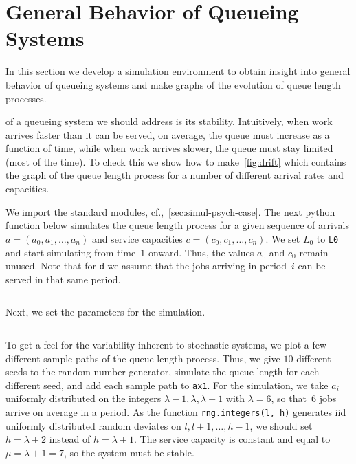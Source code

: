 \documentclass[stochastic-or.tex]{subfiles}
\begin{document}
\section{General Behavior of Queueing Systems}
\label{sec:simul-discr-time}


In this section we develop a simulation environment to obtain insight into general behavior of queueing systems and make graphs of the evolution of queue length processes.


 of a queueing system we should address is its stability.
Intuitively, when work arrives faster than it can be served, on average, the queue must increase as a function of time, while when work arrives slower, the queue must stay limited (most of the time).
To check this we show how to make~\cref{fig:drift} which contains the graph of the queue length process for a number of different arrival rates and capacities.




We import the standard modules, cf.,~\cref{sec:simul-psych-case}.
The next python function below simulates the queue length process for a given sequence of arrivals $a=(a_{0}, a_{1}, \ldots, a_{n})$ and service capacities $c = (c_{0}, c_{1}, \ldots, c_{n})$.
We set $L_{0}$ to \texttt{L0} and start simulating from time~$1$ onward.
Thus, the values $a_{0}$ and $c_{0}$ remain unused.
Note that for \texttt{d} we assume that the jobs arriving in period~$i$ can be served in that same period.
\inputminted[firstline=26, lastline=34]{python}{../code/discrete_simulations.py} %

Next, we set the parameters for the simulation.
\inputminted[firstline=40, lastline=43]{python}{../code/discrete_simulations.py} %

To get a feel for the variability inherent to stochastic systems, we plot a few different sample paths of the queue length process.
Thus, we give $10$ different seeds to the random number generator, simulate the queue length for each different seed, and add each sample path to \texttt{ax1}.
For the simulation, we take $a_{i}$ uniformly distributed on the integers $\lambda-1, \lambda, \lambda +1$ with $\lambda=6$, so that~$6$ jobs arrive on average in a period.
As the function \texttt{rng.integers(l, h)} generates iid uniformly distributed random deviates on $l, l+1, \ldots, h-1$, we should set $h=\lambda + 2$ instead of $h=\lambda +1$.
The service capacity is constant and equal to $\mu=\lambda + 1 =7$, so the system must be stable.
\inputminted[firstline=47, lastline=57]{python}{../code/discrete_simulations.py} %
\end{document}
